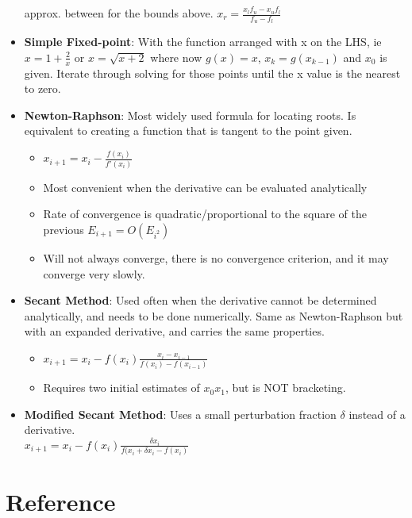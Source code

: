 \documentclass[fontsize=9pt]{scrartcl}
\begin{document}
\begin{multicols}{3}
\begin{itemize}
          approx. between for the bounds above.
          $x_r = \frac{x_lf_u-x_uf_l}{f_u-f_l}$
        \item \textbf{Simple Fixed-point}: With the function arranged with x on the LHS, ie $x = 1+\frac{2}{x}$ or
          $x = \sqrt{x+2}$ where now $g(x) = x$, $x_k = g(x_{k-1})$ and $x_0$ is given. Iterate through solving
          for those points until the x value is the nearest to zero.
        \item \textbf{Newton-Raphson}: Most widely used formula for locating roots. Is equivalent to creating a 
        function that is tangent to the point given.
          \begin{itemize}
            \item $x_{i+1} = x_i - \frac{f(x_i)}{f'(x_i)}$
            \item Most convenient when the derivative can be evaluated analytically
            \item Rate of convergence is quadratic/proportional to the square of the previous $E_{i+1} = O(E_{i^2})$
            \item Will not always converge, there is no convergence criterion, and it may converge very slowly.
          \end{itemize}
        \item \textbf{Secant Method}: Used often when the derivative cannot be determined analytically, and needs
          to be done numerically. Same as Newton-Raphson but with an expanded derivative, and carries the same
          properties.
          \begin{itemize}
            \item $x_{i+1} = x_i - f(x_i)\frac{x_i-x_{i-1}}{f(x_i)-f(x_{i-1})}$
            \item Requires two initial estimates of $x_0 x_1$, but is NOT bracketing.
          \end{itemize}
        \item \textbf{Modified Secant Method}: Uses a small perturbation fraction $\delta$ instead of a derivative. \\
          $x_{i+1} = x_i - f(x_i)\frac{\delta x_i}{f(x_i+\delta x_i-f(x_i)}$
      \end{itemize}
      
  \section{Reference}

\end{multicols}
\end{document}
